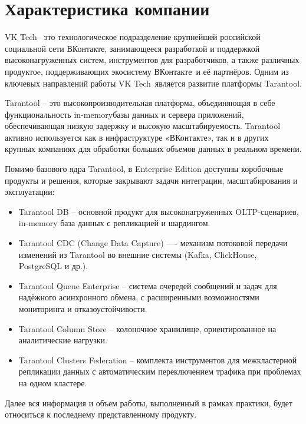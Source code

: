 
\section{Характеристика компании}

\flqq VK Tech\frqq -- это технологическое подразделение крупнейшей российской социальной сети \flqq
ВКонтакте\frqq,
занимающееся разработкой и поддержкой высоконагруженных систем, инструментов для разработчиков, а также
различных продуктоe, поддерживающих экосистему \flqq ВКонтакте\frqq\ и её партнёров. Одним из ключевых направлений
работы \flqq VK Tech\frqq\ является развитие платформы Tarantool.

Tarantool \cite{tarantool} -- это высокопроизводительная платформа, объединяющая в себе функциональность \flqq in-memory\frqq базы
данных и сервера приложений, обеспечивающая низкую задержку и высокую масштабируемость. Tarantool
активно используется как в инфраструктуре «ВКонтакте», так и в других крупных компаниях для обработки
больших объемов данных в реальном времени.

Помимо базового ядра Tarantool, в Enterprise Edition доступны коробочные продукты и решения, которые
закрывают задачи интеграции, масштабирования и эксплуатации:

\begin{itemize}
  \item Tarantool DB -- основной продукт для высоконагруженных OLTP-сценариев, in-memory база данных с
  репликацией и шардингом.
  \item Tarantool CDC (Change Data Capture) —- механизм потоковой передачи изменений из Tarantool во
  внешние системы (Kafka, ClickHouse, PostgreSQL и др.).
  \item Tarantool Queue Enterprise -- система очередей сообщений и задач для надёжного асинхронного обмена,
  с расширенными возможностями мониторинга и отказоустойчивости.
  \item Tarantool Column Store -- колоночное хранилище, ориентированное на аналитические нагрузки.
  \item Tarantool Clusters Federation -- комплекта инструментов для межкластерной репликации данных с
  автоматическим переключением трафика при проблемах на одном кластере.
\end{itemize}

Далее вся информация и объем работы, выполненный в рамках практики, будет относиться к последнему
представленному продукту.

